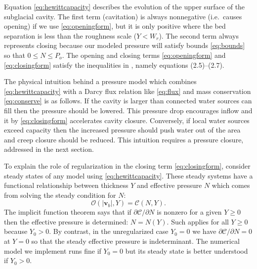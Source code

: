 \documentclass[11pt,final]{amsart}
\newcommand\bv{\mathbf{v}}
\begin{document}
Equation \eqref{eq:hewittcapacity} describes the evolution of the upper surface of the subglacial cavity.  The first term (cavitation) is always nonnegative (i.e.~causes opening) if we use \eqref{eq:openingform}, but it is only positive where the bed separation is less than the roughness scale ($Y<W_r$).  The second term always represents closing because our modeled pressure will satisfy bounds \eqref{eq:bounds} so that $0\le N \le P_o$.  The opening and closing terms \eqref{eq:openingform} and \eqref{eq:closingform} satisfy the inequalities in \cite{Schoofetal2012}, namely equations (2.5)--(2.7).

The physical intuition behind a pressure model which combines \eqref{eq:hewittcapacity} with a Darcy flux relation like \eqref{eq:flux} and mass conservation \eqref{eq:conserve} is as follows.  If the cavity is larger than connected water sources can fill then the pressure should be lowered.  This pressure drop encourages inflow and it by \eqref{eq:closingform} accelerates cavity closure.  Conversely, if local water sources exceed capacity then the increased pressure should push water out of the area and creep closure should be reduced.  This intuition requires a pressure closure, addressed in the next section.

To explain the role of regularization in the closing term \eqref{eq:closingform}, consider steady states of any model using \eqref{eq:hewittcapacity}.  These steady systems have a functional relationship between thickness $Y$ and effective pressure $N$ which comes from solving the steady condition for $N$:
\begin{equation}
\mathcal{O}(|\bv_b|,Y) = \mathcal{C}(N,Y). \label{eq:hewittsteady}
\end{equation}
The implicit function theorem says that if $\partial\mathcal{C}/\partial N$ is nonzero for a given $Y\ge 0$ then the effective pressure is determined: $N=N(Y)$.  Such applies for all $Y\ge 0$ because $Y_0>0$.  By contrast, in the unregularized case $Y_0=0$ we have $\partial\mathcal{C}/\partial N=0$ at $Y=0$ so that the steady effective pressure is indeterminant.  The numerical model we implement runs fine if $Y_0=0$ but its steady state is better understood if $Y_0>0$.
\end{document}
